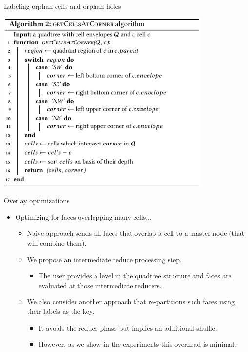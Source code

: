 \documentclass{beamer}
\begin{document}
\begin{frame}{Labeling orphan cells and orphan holes}
\begin{minipage}{0.49\textwidth}
            \includegraphics[width=0.8\textwidth]{figures/holes4}
        \end{minipage}
    \end{frame}
    
 
    \begin{frame}{Overlay optimizations}
        \begin{itemize}
            \item Optimizing for faces overlapping many cells...
                \begin{itemize}
                    \item Naive approach sends all faces that overlap a cell to a master node (that will combine them).
                    \item We propose an intermediate reduce processing step.
                    \begin{itemize}
                    \item The user provides a level in the quadtree structure and faces are evaluated at those intermediate reducers.
                   \end{itemize}
                   \item We also consider another approach that re-partitions such faces using their labels as the key.
                    \begin{itemize}
                    \item It avoids the reduce phase but implies an additional shuffle.
                    \item However, as we show in the experiments this overhead is minimal.
                    \end{itemize}
                \end{itemize}
        \end{itemize}
    \end{frame}
\end{document}
